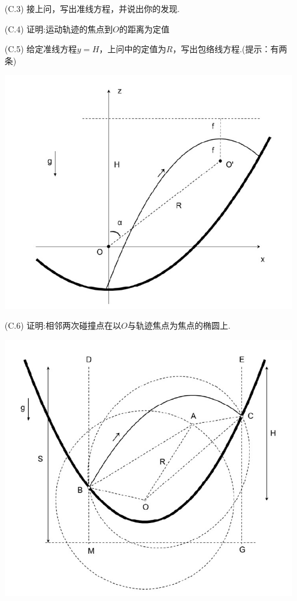 \documentclass{article}
\begin{document}
\begin{itemize}
    \item[(C.3)]接上问，写出准线方程，并说出你的发现.
    \item[(C.4)]证明:运动轨迹的焦点到$O$的距离为定值
    \item[(C.5)]给定准线方程$y=H$，上问中的定值为$R$，写出包络线方程.(提示：有两条)
        \begin{center}
    \includegraphics[scale=0.3]{img/0017.5.jpg}\par    
    \end{center}

    \item[(C.6)]证明:相邻两次碰撞点在以$O$与轨迹焦点为焦点的椭圆上. 
        
        \begin{center}
    \includegraphics[scale=0.3]{img/0017.6.jpg}\par    
    \end{center}

\end{itemize}
\end{document}

